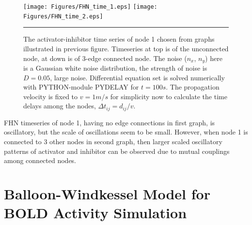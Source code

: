 \begin{figure}[htbp]
  \centering
	\texttt{[image: Figures/FHN\_time\_1.eps]}
 	\texttt{[image: Figures/FHN\_time\_2.eps]}
    \rule{35em}{0.5pt}
    \caption[FHN Time Series]{The activator-inhibitor time series of node 1 chosen from graphs illustrated in previous figure. Timeseries at top is of the unconnected node, at down is of 3-edge connected node. The noise ($n_x$, $n_y$) here is a Gaussian white noise distribution, the strength of noise is $D=0.05$, large noise. Differential equation set is solved numerically with PYTHON-module PYDELAY for $t=100s$. The propagation velocity is fixed to $v=1m/s$ for simplicity now to calculate the time delays among the nodes, $\Delta t_{ij} = d_{ij} /v$. }
  \label{fig:FHN Time Series}	
\end{figure}

FHN timeseries of node 1, having no edge connections in first graph, is oscillatory, but the scale of oscillations seem to be small. However, when node 1 is connected to 3 other nodes in second graph, then larger scaled oscillatory patterns of activator and inhibitor can be observed due to mutual couplings among connected nodes. 


\section{Balloon-Windkessel Model for BOLD Activity Simulation} 






























 
